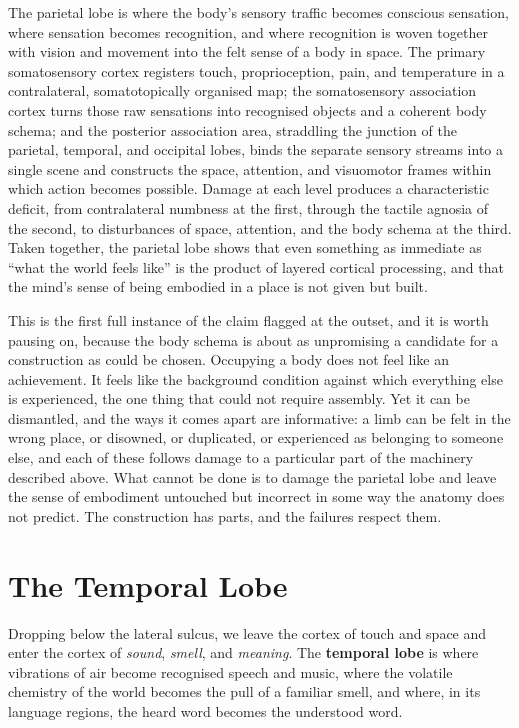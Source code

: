 \documentclass[11pt]{article}
\begin{document}
The parietal lobe is where the body's sensory traffic becomes conscious sensation, where sensation becomes recognition, and where recognition is woven together with vision and movement into the felt sense of a body in space. The primary somatosensory cortex registers touch, proprioception, pain, and temperature in a contralateral, somatotopically organised map; the somatosensory association cortex turns those raw sensations into recognised objects and a coherent body schema; and the posterior association area, straddling the junction of the parietal, temporal, and occipital lobes, binds the separate sensory streams into a single scene and constructs the space, attention, and visuomotor frames within which action becomes possible. Damage at each level produces a characteristic deficit, from contralateral numbness at the first, through the tactile agnosia of the second, to disturbances of space, attention, and the body schema at the third. Taken together, the parietal lobe shows that even something as immediate as ``what the world feels like'' is the product of layered cortical processing, and that the mind's sense of being embodied in a place is not given but built.

This is the first full instance of the claim flagged at the outset, and it is worth pausing on, because the body schema is about as unpromising a candidate for a construction as could be chosen. Occupying a body does not feel like an achievement. It feels like the background condition against which everything else is experienced, the one thing that could not require assembly. Yet it can be dismantled, and the ways it comes apart are informative: a limb can be felt in the wrong place, or disowned, or duplicated, or experienced as belonging to someone else, and each of these follows damage to a particular part of the machinery described above. What cannot be done is to damage the parietal lobe and leave the sense of embodiment untouched but incorrect in some way the anatomy does not predict. The construction has parts, and the failures respect them.


\section{The Temporal Lobe}

Dropping below the lateral sulcus, we leave the cortex of touch and space and enter the cortex of \textit{sound}, \textit{smell}, and \textit{meaning}. The \textbf{temporal lobe} is where vibrations of air become recognised speech and music, where the volatile chemistry of the world becomes the pull of a familiar smell, and where, in its language regions, the heard word becomes the understood word.
\end{document}
